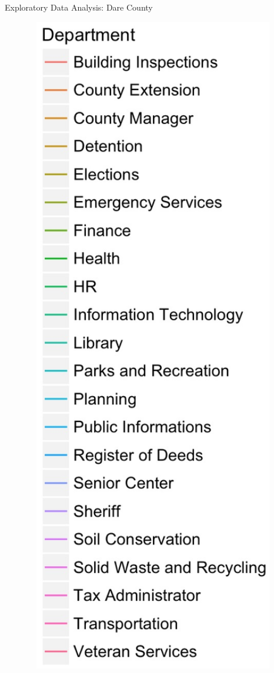 \documentclass[10pt, xcolor=table]{beamer}
\theoremstyle{definition}
\theoremstyle{remark}
\begin{document}
\begin{frame}{Exploratory Data Analysis: Dare County}
\begin{minipage}{0.13\linewidth}
\begin{figure}
	 		 		 	\includegraphics[width=1.25\textwidth]{figures/Dept2.jpg}
	 \end{figure}	
	\end{minipage}
\end{frame}
\end{document}
